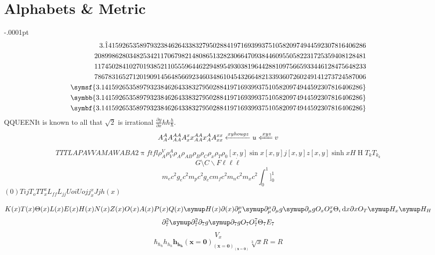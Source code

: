 \documentclass[11pt,fleqn]{article}
\newcommand{\dd}{\,\mathrm{d}}
\begin{document}
\section{Alphabets \& Metric}
\delimitershortfall-.0001pt
\[\begin{split}
  3.\hat 141592653589793238462643383279502884197169399375105820974944592307816406286\\
  208998628034825342117067982148086513282306647093844609550582231725359408128481\\ 117450284102701938521105559644622948954930381964428810975665933446128475648233\\ 786783165271201909145648566923460348610454326648213393607260249141273724587006\\
  \symsf{3.141592653589793238462643383279502884197169399375105820974944592307816406286}\\
  \symbb{3.141592653589793238462643383279502884197169399375105820974944592307816406286}\\
  \symbf{3.141592653589793238462643383279502884197169399375105820974944592307816406286}\\
\end{split}\]
Q\textsc{QUEEN}It is known to all that $\sqrt 2$ is irrational $\frac{\partial y}{\partial x}h\hbar \frac{h}{\hbar}$.
\[A_A^AA_{AA}^{AA}A_x^x x_{AA}^{AA} x_A^A A_{xx}^{xx}\xleftarrow{xyhougz}u\xLeftarrow{xyz}v\]
\[TT{}TLAPAVVAMAWABA2\uppi ft fl\rho_A^V\rho_V^A\rho_{A{}}\rho_{AB}\rho_B\rho_C\rho_x\rho_{T{}}\rho_0[x,y]\sin x[x,y]j[x,y]z[x,y]\sinh xH\upEta T_kT_{k_k}\]
\[G\setminus C\smallsetminus F \ell\ell\dot\ell\]
\[ m_ec^2 g_ec^2 m_pc^2 g_ec m_fc^2 m_nc^2 m_xc^2 \int_0^1 \big]_0^1\]
$(0) T{ijT_oTT_x^xL_{ff}L_{jj}Uo}iUojj_x^xJjh(x)$

$K(x)T(x)\Theta(x)L(x)E(x)H(x)N(x)Z(x)O(x)A(x)P(x)Q(x)\symup H(x)\partial(x)\partial_\mu^\mu\symup\partial_\mu^\mu\partial_\mu g\symup\partial_\mu g O_xO_x^x\Theta_{i}\dd  x \partial x O_T\symup H_x\symup H_H$
\[\partial_7^2\symup\partial_7^2\partial_7 g\symup\partial_7 g O_7O_7^7\Theta_{7}E_7\]
\[V_{x}\]
\[\hbar_{\hbar_\hbar} h_{h_h}\symbf{h_{h_h}(x=0)_{(x=0)_{(x=0)}}}\sqrt[3]{x}R=R\]
\end{document}
